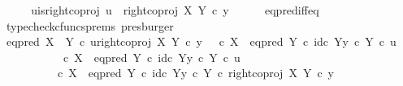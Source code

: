 \begin{isabellebody}
\ \ \isamarkupfalse%
\ \isamarkupfalse%
\ u{\isacharunderscore}{\kern0pt}is{\isacharunderscore}{\kern0pt}right{\isacharunderscore}{\kern0pt}coproj{\isacharcolon}{\kern0pt}\ {\isachardoublequoteopen}u\ {\isacharequal}{\kern0pt}\ right{\isacharunderscore}{\kern0pt}coproj\ X\ Y\ {\isasymcirc}\isactrlsub c\ y{\isachardoublequoteclose}\isanewline
\ \ \ \ \isamarkupfalse%
\ eq{\isacharunderscore}{\kern0pt}pred{\isacharunderscore}{\kern0pt}iff{\isacharunderscore}{\kern0pt}eq\ \isamarkupfalse%
\ {\isacharparenleft}{\kern0pt}typecheck{\isacharunderscore}{\kern0pt}cfuncs{\isacharunderscore}{\kern0pt}prems{\isacharcomma}{\kern0pt}\ presburger{\isacharparenright}{\kern0pt}\isanewline
\ \ \isamarkupfalse%
\ {\isachardoublequoteopen}eq{\isacharunderscore}{\kern0pt}pred\ {\isacharparenleft}{\kern0pt}X\ {\isasymCoprod}\ Y{\isacharparenright}{\kern0pt}\ {\isasymcirc}\isactrlsub c\ {\isasymlangle}u{\isacharcomma}{\kern0pt}right{\isacharunderscore}{\kern0pt}coproj\ X\ Y\ {\isasymcirc}\isactrlsub c\ y{\isasymrangle}\ {\isacharequal}{\kern0pt}\ {\isacharparenleft}{\kern0pt}{\isasymf}\ {\isasymcirc}\isactrlsub c\ {\isasymbeta}\isactrlbsub X\isactrlesub {\isacharparenright}{\kern0pt}\ {\isasymamalg}\ {\isacharparenleft}{\kern0pt}eq{\isacharunderscore}{\kern0pt}pred\ Y\ {\isasymcirc}\isactrlsub c\ {\isasymlangle}id\isactrlsub c\ Y{\isacharcomma}{\kern0pt}y\ {\isasymcirc}\isactrlsub c\ {\isasymbeta}\isactrlbsub Y\isactrlesub {\isasymrangle}{\isacharparenright}{\kern0pt}\ {\isasymcirc}\isactrlsub c\ u{\isachardoublequoteclose}\isanewline
\ \ \isamarkupfalse%
\ {\isacharminus}{\kern0pt}\isanewline
\ \ \ \ \isamarkupfalse%
\ {\isachardoublequoteopen}{\isacharparenleft}{\kern0pt}{\isasymf}\ {\isasymcirc}\isactrlsub c\ {\isasymbeta}\isactrlbsub X\isactrlesub {\isacharparenright}{\kern0pt}\ {\isasymamalg}\ {\isacharparenleft}{\kern0pt}eq{\isacharunderscore}{\kern0pt}pred\ Y\ {\isasymcirc}\isactrlsub c\ {\isasymlangle}id\isactrlsub c\ Y{\isacharcomma}{\kern0pt}y\ {\isasymcirc}\isactrlsub c\ {\isasymbeta}\isactrlbsub Y\isactrlesub {\isasymrangle}{\isacharparenright}{\kern0pt}\ {\isasymcirc}\isactrlsub c\ u\isanewline
\ \ \ \ \ \ \ \ {\isacharequal}{\kern0pt}\ {\isacharparenleft}{\kern0pt}{\isasymf}\ {\isasymcirc}\isactrlsub c\ {\isasymbeta}\isactrlbsub X\isactrlesub {\isacharparenright}{\kern0pt}\ {\isasymamalg}\ {\isacharparenleft}{\kern0pt}eq{\isacharunderscore}{\kern0pt}pred\ Y\ {\isasymcirc}\isactrlsub c\ {\isasymlangle}id\isactrlsub c\ Y{\isacharcomma}{\kern0pt}y\ {\isasymcirc}\isactrlsub c\ {\isasymbeta}\isactrlbsub Y\isactrlesub {\isasymrangle}{\isacharparenright}{\kern0pt}\ {\isasymcirc}\isactrlsub c\ right{\isacharunderscore}{\kern0pt}coproj\ X\ Y\ {\isasymcirc}\isactrlsub c\ y{\isachardoublequoteclose}\isanewline

\end{isabellebody}
